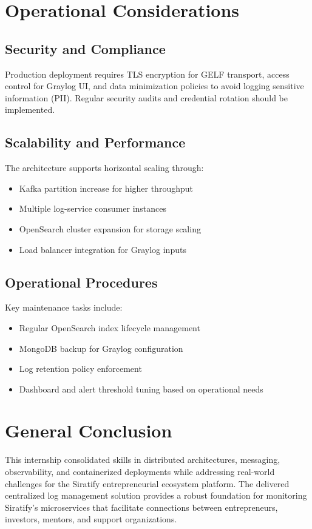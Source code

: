 \documentclass[12pt,a4paper]{report}
\begin{document}
\chapter{Operational Considerations}
\section{Security and Compliance}
Production deployment requires TLS encryption for GELF transport, access control for Graylog UI, and data minimization policies to avoid logging sensitive information (PII). Regular security audits and credential rotation should be implemented.

\section{Scalability and Performance}
The architecture supports horizontal scaling through:
\begin{itemize}[leftmargin=1.2cm]
  \item Kafka partition increase for higher throughput
  \item Multiple log-service consumer instances 
  \item OpenSearch cluster expansion for storage scaling
  \item Load balancer integration for Graylog inputs
\end{itemize}

\section{Operational Procedures}
Key maintenance tasks include:
\begin{itemize}[leftmargin=1.2cm]
  \item Regular OpenSearch index lifecycle management
  \item MongoDB backup for Graylog configuration
  \item Log retention policy enforcement
  \item Dashboard and alert threshold tuning based on operational needs
\end{itemize}

\chapter*{General Conclusion}
This internship consolidated skills in distributed architectures, messaging, observability, and containerized deployments while addressing real-world challenges for the Siratify entrepreneurial ecosystem platform. The delivered centralized log management solution provides a robust foundation for monitoring Siratify's microservices that facilitate connections between entrepreneurs, investors, mentors, and support organizations.
\end{document}
